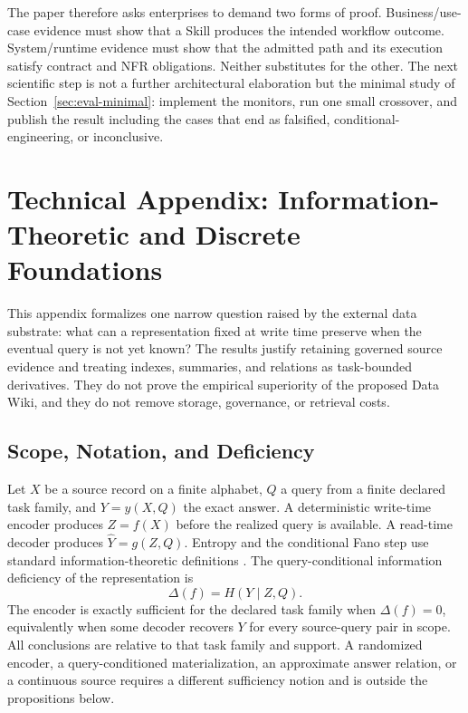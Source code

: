 \documentclass[11pt]{article}
\begin{document}
The paper therefore asks enterprises to demand two forms of proof. Business/use-case evidence must show that a Skill produces the intended workflow outcome. System/runtime evidence must show that the admitted path and its execution satisfy contract and NFR obligations. Neither substitutes for the other. The next scientific step is not a further architectural elaboration but the minimal study of Section~\ref{sec:eval-minimal}: implement the monitors, run one small crossover, and publish the result including the cases that end as falsified, conditional-engineering, or inconclusive.

\section{Technical Appendix: Information-Theoretic and Discrete Foundations}
\label{sec:formal-data-foundations}

This appendix formalizes one narrow question raised by the external data substrate: what can a representation fixed at write time preserve when the eventual query is not yet known? The results justify retaining governed source evidence and treating indexes, summaries, and relations as task-bounded derivatives. They do not prove the empirical superiority of the proposed Data Wiki, and they do not remove storage, governance, or retrieval costs.

\subsection{Scope, Notation, and Deficiency}

Let $X$ be a source record on a finite alphabet, $Q$ a query from a finite declared task family, and $Y=y(X,Q)$ the exact answer. A deterministic write-time encoder produces $Z=f(X)$ before the realized query is available. A read-time decoder produces $\widehat{Y}=g(Z,Q)$. Entropy and the conditional Fano step use standard information-theoretic definitions \cite{cover2006elements}. The query-conditional information deficiency of the representation is
\begin{equation}
\Delta(f)=H(Y\mid Z,Q).
\end{equation}
The encoder is exactly sufficient for the declared task family when $\Delta(f)=0$, equivalently when some decoder recovers $Y$ for every source-query pair in scope. All conclusions are relative to that task family and support. A randomized encoder, a query-conditioned materialization, an approximate answer relation, or a continuous source requires a different sufficiency notion and is outside the propositions below.
\end{document}
